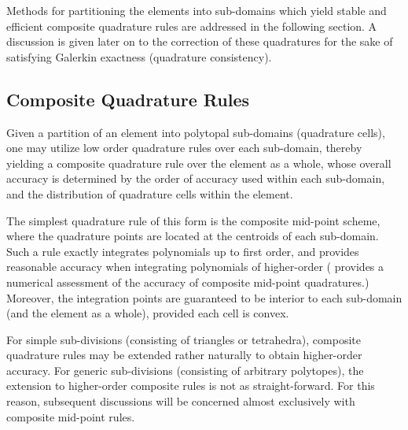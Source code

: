 Methods for partitioning the elements into sub-domains which yield stable and efficient composite quadrature rules are addressed in the following section. A discussion is given later on to the correction of these quadratures for the sake of satisfying Galerkin exactness (quadrature consistency).
		
	\subsection*{Composite Quadrature Rules}
	
	Given a partition of an element into polytopal sub-domains (quadrature cells), one may utilize low order quadrature rules over each sub-domain, thereby yielding a composite quadrature rule over the element as a whole, whose overall accuracy is determined by the order of accuracy used within each sub-domain, and the distribution of quadrature cells within the element.
	
	The simplest quadrature rule of this form is the composite mid-point scheme, where the quadrature points are located at the centroids of each sub-domain. Such a rule exactly integrates polynomials up to first order, and provides reasonable accuracy when integrating polynomials of higher-order (\cite{Rashid:12} provides a numerical assessment of the accuracy of composite mid-point quadratures.) Moreover, the integration points are guaranteed to be interior to each sub-domain (and the element as a whole), provided each cell is convex.
	
	For simple sub-divisions (consisting of triangles or tetrahedra), composite quadrature rules may be extended rather naturally to obtain higher-order accuracy. For generic sub-divisions (consisting of arbitrary polytopes), the extension to higher-order composite rules is not as straight-forward. For this reason, subsequent discussions will be concerned almost exclusively with composite mid-point rules.
	
